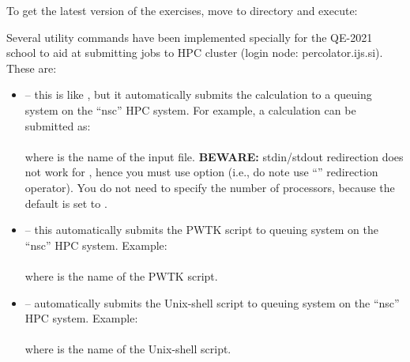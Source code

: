 \documentclass[landscape]{foils}
\begin{document}
To get the latest version of the exercises, move to  directory and execute:\\[0.5em]

\rightheader{}

Several utility commands have been implemented specially for the
QE-2021 school to aid at submitting jobs to HPC cluster (login node:
percolator.ijs.si). These are: {\small
\begin{itemize}
\item {} -- this is like , but it
  automatically submits the calculation to a queuing system on the
  ``nsc'' HPC system. For example, a  calculation can be
  submitted
  as:\\[0.5em]
  \\[0.5em]
  where  is the name of the  input
  file. {\bf BEWARE:} stdin/stdout redirection does not work for
  , hence you must use  option (i.e.,
  do note use ``\cmd{<}'' redirection operator). You do not need to
  specify the number of processors, because the default is set to
  .
  \vspace{0.5em}
\item {} -- this automatically submits the PWTK
  script to queuing system on the ``nsc'' HPC system. Example:\\[0.5em]
  \\[0.5em]
  where  is the name of the PWTK script.
\vspace{0.5em}
\item {} -- automatically submits the Unix-shell
  script to queuing system on the ``nsc''  HPC system. Example:\\[0.5em]
  \\[0.5em]
  where  is the name of the Unix-shell script.


\end{itemize}}
\end{document}
